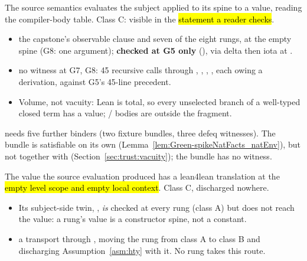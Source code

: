 \begin{assumption}
\label{asm:hev}
\stAssumed{}  The source semantics evaluates the subject applied to its spine to a
value, reading the compiler-body table. Class C: visible in the \hl{statement a reader checks}.
\begin{itemize}
\item {} the capstone's observable clause and seven of the eight rungs, at the
empty spine (G8: one argument); \textbf{checked at G5 only} (\stChecked{}), via delta then iota at
.
\item {} no witness at G7, G8: 45 recursive calls through ,
, , , each owing a derivation, against G5's 45-line
precedent.
\item Volume, not vacuity: Lean is total, so every unselected branch of a well-typed closed term
has a value; / bodies are outside the fragment.
\end{itemize}
\end{assumption}

\begin{remark}
  needs five further binders (two fixture bundles, three
defeq witnesses). The  bundle is satisfiable on its own
(Lemma~\ref{lem:Green-spikeNatFacts_natEnv}), but not together with 
(Section~\ref{sec:trust:vacuity}); the  bundle has no witness.
\end{remark}

\begin{assumption}
\label{asm:hvwt}
\stAssumed{}  The value the source evaluation produced has a lean4lean translation
at the \hl{empty level scope and empty local context}. Class C, discharged nowhere.
\begin{itemize}
\item Its subject-side twin, , \emph{is} checked at every rung (class A) but does not
reach the value: a rung's value is a constructor spine, not a constant.
\item {} a transport through , moving the rung from
class A to class B and discharging Assumption~\ref{asm:hty} with it. No rung takes this route.
\end{itemize}
\end{assumption}

